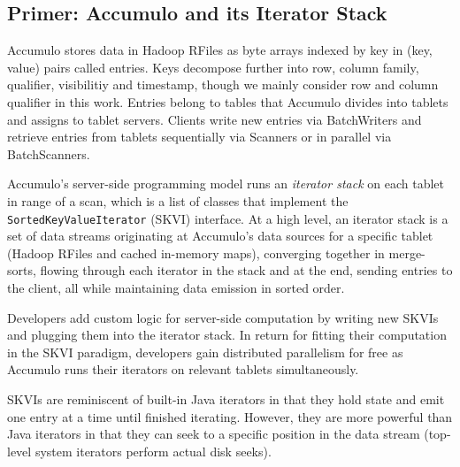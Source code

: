 





\subsection{Primer: Accumulo and its Iterator Stack}
\label{sAccumuloIterators}
Accumulo stores data in Hadoop RFiles as byte arrays indexed by key in (key, value) pairs called entries.
Keys decompose further into row, column family, qualifier, visibilitiy and timestamp,
though we mainly consider row and column qualifier in this work.
Entries belong to tables that Accumulo divides into tablets and assigns to tablet servers.
Clients write new entries via BatchWriters and retrieve entries from tablets sequentially via Scanners
or in parallel via BatchScanners.

Accumulo's server-side programming model runs an \emph{iterator stack} on each tablet in range of a scan, 
which is a list of classes that implement the \texttt{SortedKeyValueIterator} (SKVI) interface.
At a high level, an iterator stack is a set of data streams originating
at Accumulo's data sources for a specific tablet (Hadoop RFiles and cached in-memory maps), 
converging together in merge-sorts,
flowing through each iterator in the stack and at the end, sending entries to the client,
all while maintaining data emission in sorted order.

Developers add custom logic for server-side computation
by writing new SKVIs and plugging them into the iterator stack.
In return for fitting their computation in the SKVI paradigm, developers gain
distributed parallelism for free as Accumulo runs their iterators on relevant tablets simultaneously.


SKVIs are reminiscent of built-in Java iterators in that they hold state 
and emit one entry at a time until finished iterating.
However, they are more powerful than Java iterators in that they can seek to a specific position
in the data stream (top-level system iterators perform actual disk seeks).

